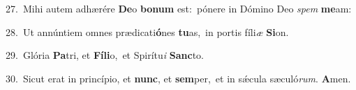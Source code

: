 {\numbfont\textcolor{\numbcolor}{27.}}~Mihi autem adhærére \textbf{De}\-o \textbf{bo}\-\textbf{num} est:~\star pónere in Dómino Deo \textit{spem} \textbf{me}\-am:\par
{\numbfont\textcolor{\numbcolor}{28.}}~Ut annúntiem omnes prædicati\-\textbf{ó}\-nes \textbf{tu}\-as,~\star in portis fíli\textit{æ} \textbf{Si}\-on.\par
{\numbfont\textcolor{\numbcolor}{29.}}~Glória \textbf{Pa}\-tri, et \textbf{Fí}\-\textbf{li}o,~\star et Spirítu\textit{i} \textbf{Sanc}\-to.\par
{\numbfont\textcolor{\numbcolor}{30.}}~Sicut erat in princípio, et \textbf{nunc}\-, et \textbf{sem}\-per,~\star et in sǽcula sæculó\-\textit{rum}\-. \textbf{A}\-men.\par
